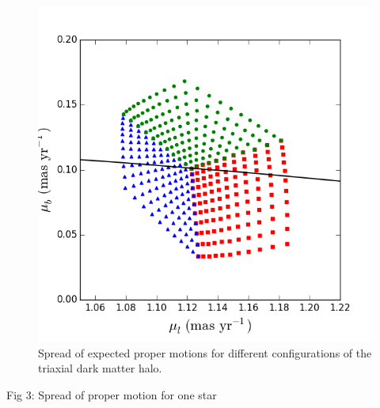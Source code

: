 \documentclass[iop]{emulateapj}
\begin{document}
\begin{figure}[t]
\includegraphics[width=1.05\hsize]{pm_hvs5.png}
  \vspace{-0.2cm}
\caption{\small Spread of expected proper motions for different configurations of the triaxial dark matter halo.}
  \vspace{0.3cm}
  \label{fig:pm_hvs5}
\end{figure}

Fig 3: Spread of proper motion for one star

\end{document}
